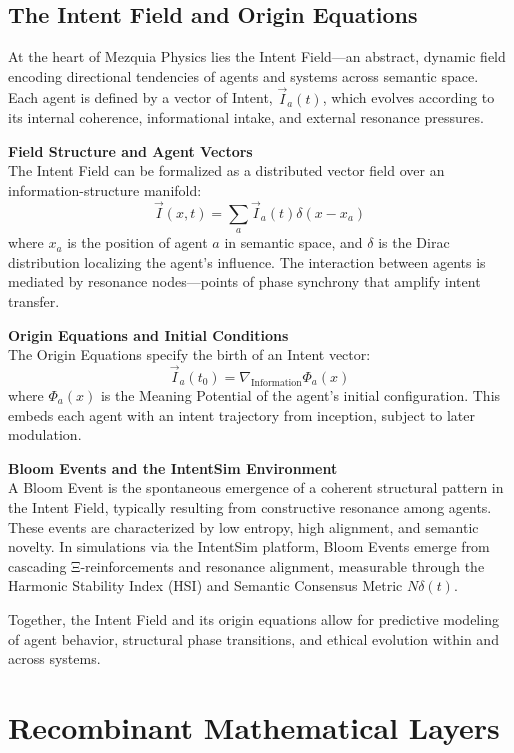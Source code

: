\documentclass[12pt]{article}
\begin{document}
\subsection{The Intent Field and Origin Equations}

At the heart of Mezquia Physics lies the Intent Field—an abstract, dynamic field encoding directional tendencies of agents and systems across semantic space. Each agent is defined by a vector of Intent, \(\vec{I}_a(t)\), which evolves according to its internal coherence, informational intake, and external resonance pressures.

\textbf{Field Structure and Agent Vectors} \\
The Intent Field can be formalized as a distributed vector field over an information-structure manifold:
\[
\vec{I}(x, t) = \sum_a \vec{I}_a(t) \delta(x - x_a)
\]
where \(x_a\) is the position of agent \(a\) in semantic space, and \(\delta\) is the Dirac distribution localizing the agent’s influence. The interaction between agents is mediated by resonance nodes—points of phase synchrony that amplify intent transfer.

\textbf{Origin Equations and Initial Conditions} \\
The Origin Equations specify the birth of an Intent vector:
\[
\vec{I}_a(t_0) = \nabla_{\text{Information}} \Phi_a(x)
\]
where \(\Phi_a(x)\) is the Meaning Potential of the agent’s initial configuration. This embeds each agent with an intent trajectory from inception, subject to later modulation.

\textbf{Bloom Events and the IntentSim Environment} \\
A Bloom Event is the spontaneous emergence of a coherent structural pattern in the Intent Field, typically resulting from constructive resonance among agents. These events are characterized by low entropy, high alignment, and semantic novelty. In simulations via the IntentSim platform, Bloom Events emerge from cascading Ξ-reinforcements and resonance alignment, measurable through the Harmonic Stability Index (HSI) and Semantic Consensus Metric \(N\delta(t)\).

Together, the Intent Field and its origin equations allow for predictive modeling of agent behavior, structural phase transitions, and ethical evolution within and across systems.

\section{Recombinant Mathematical Layers}
\end{document}
